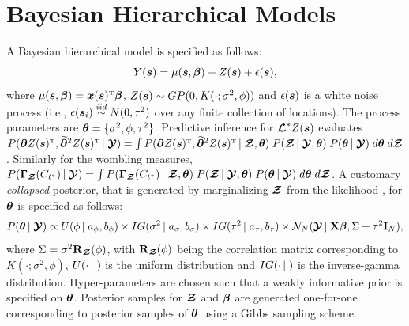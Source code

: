 \section{Bayesian Hierarchical Models}\label{sec:review_bhm}
    A Bayesian hierarchical model is specified as follows:
    \begin{equation}\label{eq:bhm}
        Y(\bs) = \mu(\bs, \bbeta)+Z(\bs)+\epsilon(\bs),
    \end{equation}
    where $\mu(\bs,\bbeta)=\bx(\bs)^{\T}\bbeta$, $Z(\bs)\sim GP(0,K(\cdot;\sigma^2,\phi))$ and $\epsilon(\bs)$ is a white noise process (i.e., $\epsilon(\bs_i) \overset{iid}{\sim} N(0, \tau^2)$ over any finite collection of locations). The process parameters are $\btheta =\{\sigma^2, \phi, \tau^2\}$. Predictive inference for $\L^*Z(\bs)$ evaluates $P(\bpartial Z(\bs)^{\T}, \widetilde{\bpartial}^2Z(\bs)^{\T}\given \Y)=\int P(\bpartial Z(\bs)^{\T}, \widetilde{\bpartial}^2Z(\bs)^{\T}\given \Z,\btheta)\; P(\Z\given \Y,\btheta)\; P(\btheta\given \Y)\;d\btheta\;d\Z$. Similarly for the wombling measures, $P(\bGamma_\Z(C_{t^*})\given \Y)=\int P(\bGamma_\Z(C_{t^*})\given \Z,\btheta)\;P(\Z\given \Y,\btheta)\;P(\btheta\given \Y)\;d\btheta\;d\Z$. A customary \emph{collapsed} posterior, { that is generated by marginalizing $\Z$ from the likelihood} \citep[see, e.g.][]{finley2019efficient}, for $\btheta$ is specified as follows:
    \begin{equation}\label{eq:full_posterior}
        P(\btheta\given\Y)\propto U(\phi\given a_\phi,b_\phi)\times IG(\sigma^2\given a_\sigma,b_\sigma)\times IG(\tau^2\given a_\tau,b_\tau)\times \N_N(\Y\given \bX\bbeta, \Sigma +\tau^2\bI_N),
    \end{equation}
    where $\Sigma = \sigma^2\bR_\Z(\phi)$, with $\bR_\Z(\phi)$ being the correlation matrix corresponding to $K(\cdot;\sigma^2,\phi)$, $U(\cdot\, | \;)$ is the uniform distribution and $IG(\cdot\, | \;)$ is the inverse-gamma distribution. Hyper-parameters are chosen such that a weakly informative prior is specified on $\btheta$. Posterior samples for $\Z$ and $\bbeta$ are generated one-for-one corresponding to posterior samples of $\btheta$ using a Gibbs sampling scheme.

